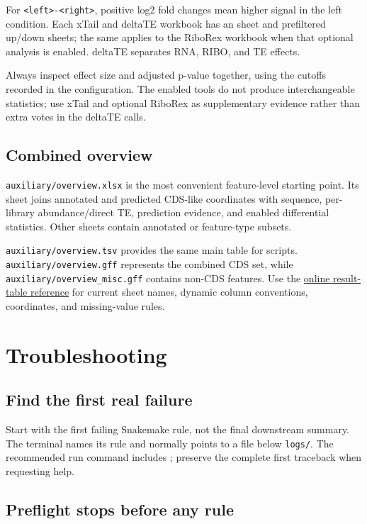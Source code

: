 \documentclass[11pt,a4paper]{article}
\newcommand{\setting}[1]{\texttt{\detokenize{#1}}}
\newcommand{\file}[1]{\nolinkurl{#1}}
\begin{document}
For \file{<left>-<right>}, positive log2 fold changes mean higher signal in the
left condition. Each xTail and deltaTE workbook has an \setting{all} sheet and
prefiltered up/down sheets; the same applies to the RiboRex workbook when that
optional analysis is enabled. deltaTE separates RNA, RIBO, and TE effects.

Always inspect effect size and adjusted p-value together, using the cutoffs
recorded in the configuration. The enabled tools do not produce interchangeable
statistics; use xTail and optional RiboRex as supplementary evidence rather
than extra votes in the deltaTE calls.

\subsection{Combined overview}

\file{auxiliary/overview.xlsx} is the most convenient feature-level starting
point. Its \setting{all} sheet joins annotated and predicted CDS-like
coordinates with sequence, per-library abundance/direct TE, prediction
evidence, and enabled differential statistics. Other sheets contain annotated
or feature-type subsets.

\file{auxiliary/overview.tsv} provides the same main table for scripts.
\file{auxiliary/overview.gff} represents the combined CDS set, while
\file{auxiliary/overview_misc.gff} contains non-CDS features. Use the
\href{https://hribo.readthedocs.io/en/stable/table-reference.html}{online
result-table reference} for current sheet names, dynamic column conventions,
coordinates, and missing-value rules.

\section{Troubleshooting}

\subsection{Find the first real failure}

Start with the first failing Snakemake rule, not the final downstream summary.
The terminal names its rule and normally points to a file below \file{logs/}.
The recommended run command includes \setting{--show-failed-logs}; preserve
the complete first traceback when requesting help.

\subsection{Preflight stops before any rule}
\end{document}
